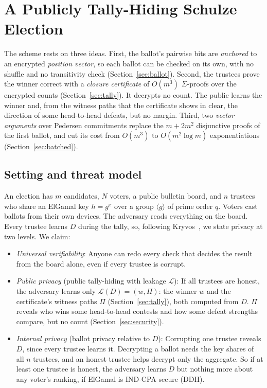 \section{A Publicly Tally-Hiding Schulze Election}\label{sec:schulze}
The scheme rests on three ideas. First, the ballot's pairwise bits are
\emph{anchored} to an encrypted \emph{position vector}, so each ballot
can be checked on its own, with no shuffle and no transitivity check
(Section~\ref{sec:ballot}). Second, the trustees prove the winner correct
with a \emph{closure certificate} of $O(m^3)$ $\Sigma$-proofs over the
encrypted counts (Section~\ref{sec:tally}). It decrypts no count. The
public learns the winner and, from the witness paths that the
certificate shows in clear, the direction of some head-to-head defeats,
but no margin. Third, two \emph{vector arguments} over Pedersen
commitments replace the $m + 2m^2$ disjunctive proofs of the first
ballot, and cut its cost from $O(m^3)$ to $O(m^2 \log m)$
exponentiations (Section~\ref{sec:batched}).

\subsection{Setting and threat model}\label{sec:threat}
An election has $m$ candidates, $N$ voters, a public bulletin board, and
$n$ trustees who share an ElGamal key $h = g^x$ over a group $\langle
g\rangle$ of prime order $q$. Voters cast ballots from their own devices.
The adversary reads everything on the board. Every trustee learns $D$
during the tally, so, following Kryvos~\cite{kryvos2022}, we state
privacy at two levels. We claim:
\begin{itemize}
  \item \emph{Universal verifiability}: Anyone can redo every check that
  decides the result from the board alone, even if every trustee is
  corrupt.
  \item \emph{Public privacy} (public tally-hiding with leakage
  $\mathcal{L}$): If all trustees are honest, the adversary learns only
  $\mathcal{L}(D) = (w, \Pi)$: the winner $w$ and the certificate's
  witness paths $\Pi$ (Section~\ref{sec:tally}), both computed from $D$.
  $\Pi$ reveals who wins some head-to-head contests and how some defeat
  strengths compare, but no count (Section~\ref{sec:security}).
  \item \emph{Internal privacy} (ballot privacy relative to $D$):
  Corrupting one trustee reveals $D$, since every trustee learns it.
  Decrypting a ballot needs the key shares of all $n$ trustees, and an
  honest trustee helps decrypt only the aggregate. So if at least one
  trustee is honest, the adversary learns $D$ but nothing more about any
  voter's ranking, if ElGamal is IND-CPA secure (DDH).
\end{itemize}



